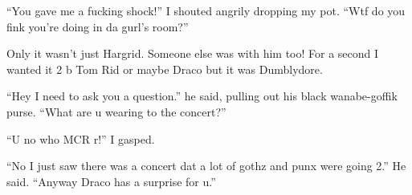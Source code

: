 \enquote{You gave me a fucking shock!} I shouted angrily dropping my pot. \enquote{Wtf do you fink you're doing in da gurl's room?}

Only it wasn't just Hargrid. Someone else was with him too! For a second I wanted it 2 b Tom Rid or maybe Draco but it was Dumblydore.

\enquote{Hey I need to ask you a question.} he said, pulling out his black wanabe-goffik purse. \enquote{What are u wearing to the concert?}

\enquote{U no who MCR r!} I gasped.

\enquote{No I just saw there was a concert dat a lot of gothz and punx were going 2.} He said. \enquote{Anyway Draco has a surprise for u.}

